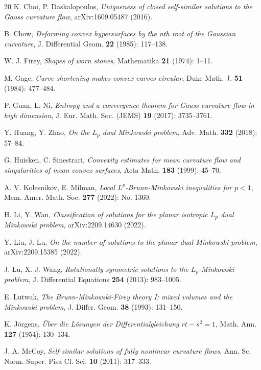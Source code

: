 \documentclass[12pt]{amsart}
\theoremstyle{definition}
\numberwithin{equation}{section}
\theoremstyle{remark}
\numberwithin{equation}{section}
\begin{document}
\begin{thebibliography}{20}
 K. Choi, P. Daskalopoulos, \textit{Uniqueness of closed self-similar solutions to the Gauss curvature flow}, arXiv:1609.05487 (2016).

 B. Chow, \textit{Deforming convex hypersurfaces by the nth root of the Gaussian curvature}, J. Differential Geom.  \textbf{22} (1985): 117--138.

 W. J. Firey, \textit{Shapes of worn stones}, Mathematika \textbf{21} (1974): 1--11.

 M. Gage, \textit{Curve shortening makes convex curves circular}, Duke Math. J. \textbf{51} (1984): 477--484.

 P. Guan, L. Ni, \textit{Entropy and a convergence theorem for Gauss curvature flow in high dimension}, J. Eur. Math. Soc. (JEMS) \textbf{19} (2017): 3735--3761.

 Y. Huang, Y. Zhao, \textit{On the $L_p$ dual Minkowski problem}, Adv. Math. \textbf{332} (2018): 57--84.

 G. Huisken, C. Sinestrari, \textit{Convexity estimates for mean curvature flow and singularities of mean convex surfaces}, Acta Math. \textbf{183} (1999): 45--70.

 A. V. Kolesnikov, E. Milman, \textit{Local $L^p$-Brunn-Minkowski inequalities for $p<1$}, Mem. Amer. Math. Soc. \textbf{277} (2022): No. 1360. %

 H. Li, Y. Wan, \textit{Classification of solutions for the planar isotropic $L_p$ dual Minkowski problem}, arXiv:2209.14630 (2022).

 Y. Liu, J. Lu, \textit{On the number of solutions to the planar dual Minkowski problem}, arXiv:2209.15385 (2022).

 J. Lu, X. J. Wang, \textit{Rotationally symmetric solutions to the  $L_p$-Minkowski problem}, J. Differential Equations \textbf{254} (2013): 983--1005.

 E. Lutwak, \textit{The Brunn-Minkowski-Firey theory I: mixed volumes and the Minkowski problem}, J. Differ. Geom. \textbf{38} (1993): 131--150.

 K. J\"{o}rgens, \textit{\"{U}ber die L\"{o}sungen der Differentialgleichung $rt-s^2=1$}, Math. Ann. \textbf{127} (1954): 130--134.

  J. A. McCoy, \textit{Self-similar solutions of fully nonlinear curvature flows}, Ann. Sc. Norm. Super. Pisa Cl. Sci. \textbf{10} (2011): 317--333.


\end{thebibliography}
\end{document}
